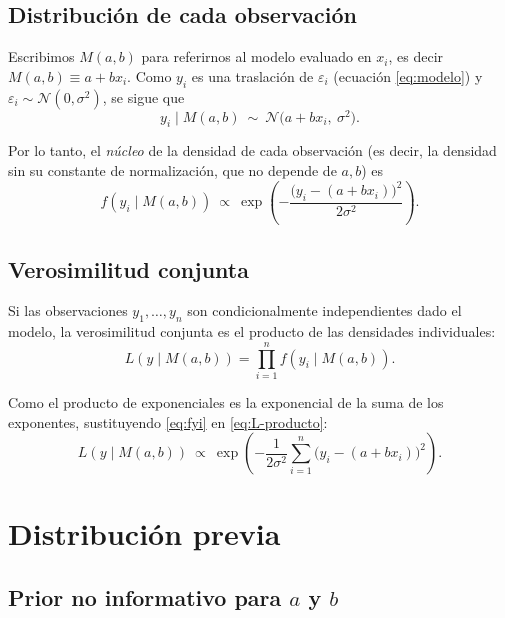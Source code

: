 \documentclass[11pt]{article}
\theoremstyle{remark}
\begin{document}
\subsection{Distribución de cada observación}

Escribimos $M(a,b)$ para referirnos al modelo evaluado en $x_i$, es decir
$M(a,b)\equiv a+bx_i$. Como $y_i$ es una traslación de $\varepsilon_i$
(ecuación \eqref{eq:modelo}) y $\varepsilon_i\sim\mathcal N(0,\sigma^2)$, se
sigue que
\begin{equation}
y_i \mid M(a,b) \ \sim\ \mathcal{N}\!\big(a+bx_i,\ \sigma^2\big).
\label{eq:dist-yi}
\end{equation}

Por lo tanto, el \emph{núcleo} de la densidad de cada observación (es decir,
la densidad sin su constante de normalización, que no depende de $a,b$) es
\begin{equation}
f(y_i\mid M(a,b)) \ \propto\ \exp\!\left(-\frac{\big(y_i-(a+bx_i)\big)^2}{2\sigma^2}\right).
\label{eq:fyi}
\end{equation}

\subsection{Verosimilitud conjunta}

Si las observaciones $y_1,\dots,y_n$ son condicionalmente independientes dado
el modelo, la verosimilitud conjunta es el producto de las densidades
individuales:
\begin{equation}
L(y\mid M(a,b)) = \prod_{i=1}^{n} f(y_i\mid M(a,b)).
\label{eq:L-producto}
\end{equation}

Como el producto de exponenciales es la exponencial de la suma de los
exponentes, sustituyendo \eqref{eq:fyi} en \eqref{eq:L-producto}:
\begin{equation}
L(y\mid M(a,b)) \ \propto\ \exp\!\left(-\frac{1}{2\sigma^2}\sum_{i=1}^{n}\big(y_i-(a+bx_i)\big)^2\right).
\label{eq:L-final}
\end{equation}

\section{Distribución previa}

\subsection{Prior no informativo para \texorpdfstring{$a$ y $b$}{a y b}}
\end{document}
